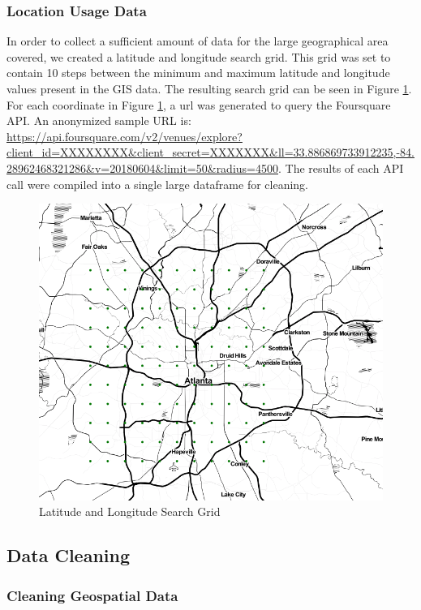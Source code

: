 \documentclass[11pt]{amsart}
\begin{document}
\subsubsection{Location Usage Data}
In order to collect a sufficient amount of data for the large geographical area covered, we created a latitude and longitude search grid. This grid was set to contain 10 steps between the minimum and maximum latitude and longitude values present in the GIS data. The resulting search grid can be seen in Figure \ref{fig:gridmap}. For each coordinate in Figure \ref{fig:gridmap}, a url was generated to query the Foursquare API. An anonymized sample URL is: \url{https://api.foursquare.com/v2/venues/explore?client_id=XXXXXXXX&client_secret=XXXXXXX&ll=33.886869733912235,-84.28962468321286&v=20180604&limit=50&radius=4500}.
The results of each API call were compiled into a single large dataframe for cleaning.
\begin{figure}
\includegraphics[width=\textwidth]{gridmap}
\caption{Latitude and Longitude Search Grid}
\label{fig:gridmap}
\end{figure}
\subsection{Data Cleaning}
\subsubsection{Cleaning Geospatial Data}
\end{document}
